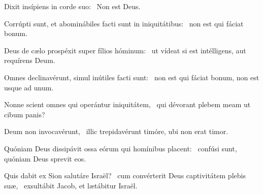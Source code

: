 \item Dixit insípiens in corde suo:~\psstar{} Non est Deus.

\item Corrúpti sunt, et abominábiles facti sunt in iniquitátibus:~\psstar{} non est qui fáciat bonum.

\item Deus de cælo prospéxit super fílios hóminum:~\psstar{} ut vídeat si est intélligens, aut requírens Deum.

\item Omnes declinavérunt, simul inútiles facti sunt:~\psstar{} non est qui fáciat bonum, non est usque ad unum.

\item Nonne scient omnes qui operántur iniquitátem,~\psstar{} qui dévorant plebem meam ut cibum panis?

\item Deum non invocavérunt,~\psstar{} illic trepidavérunt timóre, ubi non erat timor.

\item Quóniam Deus dissipávit ossa eórum qui homínibus placent:~\psstar{} confúsi sunt, quóniam Deus sprevit eos.

\item Quis dabit ex Sion salutáre Israël?~\pscross{} cum convérterit Deus captivitátem plebis suæ,~\psstar{} exsultábit Jacob, et lætábitur Israël.